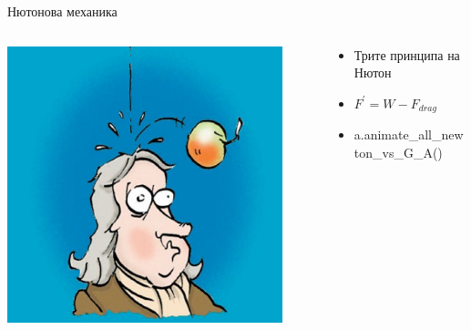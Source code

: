 \documentclass[10pt,a4paper]{beamer}
\begin{document}
        \begin{frame}{ Нютонова механика }
            \begin{columns}
                \begin{column}{0.5\textwidth}
                    \includegraphics[width=0.9\textwidth]{images/newton_apple.jpg}
                \end{column}
                \begin{column}{0.5\textwidth}
                    \begin{itemize}
                        \item Трите принципа на Нютон
                        \item $ F^{\prime} = W - F_{drag} $
                        \item a.animate\_all\_newton\_vs\_G\_A()
                    \end{itemize}
                \end{column}
            \end{columns}
        \end{frame}
        
\end{document}
